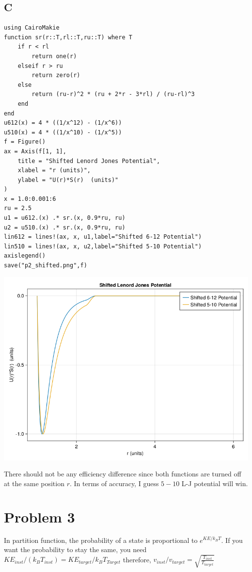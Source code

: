 \documentclass[11pt]{article}
\begin{document}
\subsection{C}
\label{sec:org58d57d6}
\begin{verbatim}
using CairoMakie
function sr(r::T,rl::T,ru::T) where T
    if r < rl
        return one(r)
    elseif r > ru
        return zero(r)
    else
        return (ru-r)^2 * (ru + 2*r - 3*rl) / (ru-rl)^3
    end
end
u612(x) = 4 * ((1/x^12) - (1/x^6))
u510(x) = 4 * ((1/x^10) - (1/x^5))
f = Figure()
ax = Axis(f[1, 1],
    title = "Shifted Lenord Jones Potential",
    xlabel = "r (units)",
    ylabel = "U(r)*S(r)  (units)"
)
x = 1.0:0.001:6
ru = 2.5
u1 = u612.(x) .* sr.(x, 0.9*ru, ru)
u2 = u510.(x) .* sr.(x, 0.9*ru, ru)
lin612 = lines!(ax, x, u1,label="Shifted 6-12 Potential")
lin510 = lines!(ax, x, u2,label="Shifted 5-10 Potential")
axislegend()
save("p2_shifted.png",f)

\end{verbatim}
\begin{center}
\includegraphics[width=.9\linewidth]{./p2_shifted.png}
\end{center} There should not be any efficiency difference since both
functions are turned off at the same position \(r\). In terms of accuracy, I guess
\(5-10\) L-J potential will win.
\section{Problem 3}
\label{sec:org82b63c1}
In partition function, the probability of a state is proportional to
\(e^{KE/k_BT}\). If you want the probability to stay the same, you need
\(KE_{inst}/(k_{B} T_{inst}) = KE_{target}/k_{B}T_{Target}\) therefore,
\(v_{inst}/v_{target} = \sqrt{\frac{T_{inst}}{T_{target}}}\)
\end{document}
